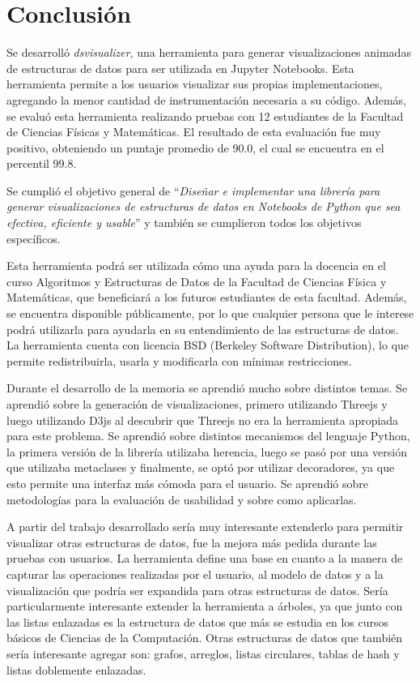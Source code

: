 \chapter{Conclusión}


Se desarrolló \textit{dsvisualizer}, una herramienta para generar visualizaciones animadas de estructuras de datos para ser utilizada en Jupyter Notebooks. Esta herramienta permite a los usuarios visualizar sus propias implementaciones, agregando la menor cantidad de instrumentación necesaria a su código. Además, se evaluó esta herramienta realizando pruebas con 12 estudiantes de la Facultad de Ciencias Físicas y Matemáticas. El resultado de esta evaluación fue muy positivo, obteniendo un puntaje promedio de 90.0, el cual se encuentra en el percentil 99.8.

Se cumplió el objetivo general de ``\textit{Diseñar e implementar una librería para generar visualizaciones de estructuras de datos en Notebooks de Python que sea efectiva, eficiente y usable}'' y también se cumplieron todos los objetivos específicos.

Esta herramienta podrá ser utilizada cómo una ayuda para la docencia en el curso Algoritmos y Estructuras de Datos de la Facultad de Ciencias Física y Matemáticas, que beneficiará a los futuros estudiantes de esta facultad. Además, se encuentra disponible públicamente, por lo que cualquier persona que le interese podrá utilizarla para ayudarla en su entendimiento de las estructuras de datos. La herramienta cuenta con licencia BSD (Berkeley Software Distribution), lo que permite redistribuirla, usarla y modificarla con mínimas restricciones.

Durante el desarrollo de la memoria se aprendió mucho sobre distintos temas. Se aprendió sobre la generación de visualizaciones, primero utilizando Threejs y luego utilizando D3js al descubrir que Threejs no era la herramienta apropiada para este problema. Se aprendió sobre distintos mecanismos del lenguaje Python, la primera versión de la librería utilizaba herencia, luego se pasó por una versión que utilizaba metaclases y finalmente, se optó por utilizar decoradores, ya que esto permite una interfaz más cómoda para el usuario. Se aprendió sobre metodologías para la evaluación de usabilidad y sobre como aplicarlas.

A partir del trabajo desarrollado sería muy interesante extenderlo para permitir visualizar otras estructuras de datos, fue la mejora más pedida durante las pruebas con usuarios. La herramienta define una base en cuanto a la manera de capturar las operaciones realizadas por el usuario, al modelo de datos y a la visualización que podría ser expandida para otras estructuras de datos. Sería particularmente interesante extender la herramienta a árboles, ya que junto con las listas enlazadas es la estructura de datos que más se estudia en los cursos básicos de Ciencias de la Computación. Otras estructuras de datos que también sería interesante agregar son: grafos, arreglos, listas circulares, tablas de hash y listas doblemente enlazadas.

